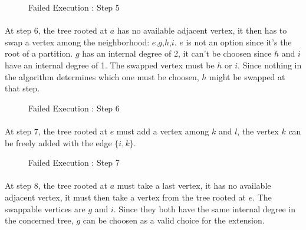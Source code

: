 \begin{figure}[H]
  \caption{Failed Execution : Step 5}
  \begin{center}
    \begin{tikzpicture}[scale=0.9,transform shape]
      
    \end{tikzpicture}
  \end{center}
\end{figure}

\paragraph{}
At step 6, the tree rooted at $a$ has no available adjacent vertex, it then
has to swap a vertex among the neighborhood: $e$,$g$,$h$,$i$. $e$ is not an
option since it's the root of a partition. $g$ has an internal degree of 2, it
can't be choosen since $h$ and $i$ have an internal degree of 1. The swapped
vertex must be $h$ or $i$. Since nothing in the algorithm determines which one
must be choosen, $h$ might be swapped at that step.

\begin{figure}[H]
  \caption{Failed Execution : Step 6}
  \begin{center}
    \begin{tikzpicture}[scale=0.9,transform shape]
      
    \end{tikzpicture}
  \end{center}
\end{figure}

\paragraph{}
At step 7, the tree rooted at $e$ must add a vertex among $k$ and $l$, the
vertex $k$ can be freely added with the edge $\{i,k\}$.

\begin{figure}[H]
  \caption{Failed Execution : Step 7}
  \begin{center}
    \begin{tikzpicture}[scale=0.9,transform shape]
      
    \end{tikzpicture}
  \end{center}
\end{figure}

\paragraph{}
At step 8, the tree rooted at $a$ must take a last vertex, it has no available
adjacent vertex, it must then take a vertex from the tree rooted at $e$. The
swappable vertices are $g$ and $i$. Since they both have the
same internal degree in the concerned tree, $g$ can be choosen as a valid
choice for the extension.

